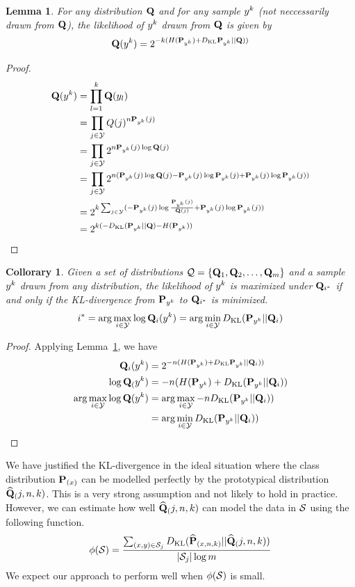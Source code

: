 \documentclass{article}
\newtheorem{lemma}[theorem]{Lemma}
\newtheorem{collorary}[theorem]{Collorary}
\begin{document}
\begin{lemma}
\label{lemma:dkl}
For any distribution $\mathbf{Q}$ and for any sample $y^k$ (not neccessarily
drawn from $\mathbf{Q}$), the likelihood of $y^k$ drawn from $\mathbf{Q}$ is given by
\[
\mathbf{Q}(y^k) = 2^{-k(H(\mathbf{P}_{y^k}) + D_{\mathrm{KL}}\mathbf{P}_{y^k} || \mathbf{Q}))}
\]
\end{lemma}
\begin{proof}
  \begin{align*}
    \mathbf{Q}(y^k) 
&= \prod_{l=1}^k \mathbf{Q}(y_l)\\ 
&= \prod_{j \in \mathcal{Y}} Q(j)^{n\mathbf{P}_{y^k}(j)}\\ 
&= \prod_{j \in \mathcal{Y}} 2^{n\mathbf{P}_{y^k}(j) \log \mathbf{Q}(j)}\\ 
&= \prod_{j \in \mathcal{Y}} 2^{n(\mathbf{P}_{y^k}(j) \log \mathbf{Q}(j) - \mathbf{P}_{y^k}(j) \log \mathbf{P}_{y^k}(j) + \mathbf{P}_{y^k}(j) \log \mathbf{P}_{y^k}(j))}\\ 
&= 2^{k \sum_{j \in \mathcal{Y}} (-\mathbf{P}_{y^k}(j) \log \frac{\mathbf{P}_{y^k}(j)}{\mathbf{Q}(j)} + \mathbf{P}_{y^k}(j) \log \mathbf{P}_{y^k}(j))}\\ 
&= 2^{k(-D_{\mathrm{KL}}(\mathbf{P}_{y^k}||\mathbf{Q}) - H(\mathbf{P}_{y^k}))}\\
  \end{align*}
\end{proof}

\begin{collorary}
\label{col:min_dkl}
Given a set of distributions $\mathcal{Q} = \{\mathbf{Q}_1,\mathbf{Q}_2, \ldots,
\mathbf{Q}_{m}\}$ and a sample $y^k$ drawn from any distribution, the
likelihood of $y^k$ is maximized under $\mathbf{Q}_{i^*}$ if and only if
the KL-divergence from $\mathbf{P}_{y^k}$ to $\mathbf{Q}_{i^*}$ is minimized.
\[
 i^* = \arg\max_{i \in \mathcal{Y}} \log \mathbf{Q}_i(y^k) = \arg\min_{i \in \mathcal{Y}} D_{\mathrm{KL}}(\mathbf{P}_{y^k}||\mathbf{Q}_i)
\]
\end{collorary}
\begin{proof}
  Applying Lemma~\ref{lemma:dkl}, we have
  \begin{align*}
    \mathbf{Q}_i(y^k) &= 2^{-n(H(\mathbf{P}_{y^k}) + D_{\mathrm{KL}}\mathbf{P}_{y^k} || \mathbf{Q}_i))}\\
    \log \mathbf{Q}_(y^k) &= -n(H(\mathbf{P}_{y^k}) + D_{\mathrm{KL}}(\mathbf{P}_{y^k} || \mathbf{Q}_i))\\
    \arg\max_{i \in \mathcal{Y}} \log \mathbf{Q}(y^k) &= \arg\max_{i \in \mathcal{Y}} - nD_{\mathrm{KL}}(\mathbf{P}_{y^k} || \mathbf{Q}_i))\\ 
    &= \arg\min_{i \in \mathcal{Y}} D_{\mathrm{KL}}(\mathbf{P}_{y^k} || \mathbf{Q}_i))\\
  \end{align*}
\end{proof}

We have justified the KL-divergence in the ideal situation where the
class distribution $\mathbf{P}_{(x)}$ can be modelled perfectly by the
prototypical distribution $\widehat{\mathbf{Q}}_(j,n,k)$. This is a very strong assumption
and not likely to hold in practice. However, we can estimate how well
$\widehat{\mathbf{Q}}_(j,n,k)$ can model the data in $\mathcal{S}$ using the following
function.
\[
\phi(\mathcal{S}) = \frac{\sum_{(x,y) \in \mathcal{S}_j} D_{\mathrm{KL}}(\widehat{\mathbf{P}}_{(x,n,k)} ||
  \widehat{\mathbf{Q}}_(j,n,k))}{|\mathcal{S}_j| \log m} 
\]
We expect our approach to perform well when $\phi(\mathcal{S})$ is
small. 
\end{document}
